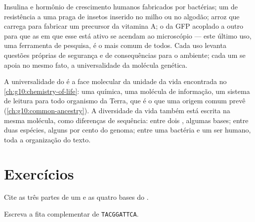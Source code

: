 \begin{example}\label{ex:g10:universal-dna:uses}
Insulina e hormônio de crescimento humanos fabricados por bactérias; um
 de resistência a uma praga de insetos inserido no milho ou no
algodão; arroz que carrega  para fabricar um precursor da vitamina
A; o  da GFP acoplado a outro  para que as  em que esse
 está ativo se acendam ao microscópio --- este último uso, uma
ferramenta de pesquisa, é o mais comum de todos. Cada uso levanta
questões próprias de segurança e de consequências para o ambiente; cada
um se apoia no mesmo fato, a universalidade da molécula genética.
\end{example}

\begin{remark}\label{rem:g10:universal-dna:unity}
A universalidade do  é a face molecular da unidade da vida
encontrada no \cref{ch:g10:chemistry-of-life}: uma química, uma
molécula de informação, um sistema de leitura para todo organismo da
Terra, que é o que uma origem comum prevê
(\cref{ch:g10:common-ancestry}). A diversidade da vida também está
escrita na mesma molécula, como diferenças de sequência: entre dois
, algumas bases; entre duas espécies, alguns por cento do genoma;
entre uma bactéria e um ser humano, toda a organização do texto.
\end{remark}

\section{Exercícios}

\begin{exercise}[$\star$]\label{exo:g10:universal-dna:1}
Cite as três partes de um  e as quatro bases do .
\end{exercise}

\begin{exercise}[$\star$]\label{exo:g10:universal-dna:2}
Escreva a fita complementar de \texttt{TACGGATTCA}.
\end{exercise}

